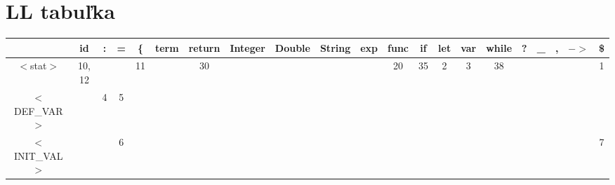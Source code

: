 \documentclass[a4paper,11pt]{article}
\begin{document}
\section{LL tabuľka}
\begin{table}[htbp]

\tiny
\begin{tabular}{|c|c|c|c|c|c|c|c|c|c|c|c|c|c|c|c|c|c|c|c|c|} 
\hline
              & \multicolumn{1}{c|}{id}     & \multicolumn{1}{c|}{:} & \multicolumn{1}{c|}{=} & \multicolumn{1}{c|}{\{} & \multicolumn{1}{c|}{term} & \multicolumn{1}{c|}{return} & \multicolumn{1}{c|}{Integer} & \multicolumn{1}{c|}{Double} & \multicolumn{1}{c|}{String} & \multicolumn{1}{c|}{exp} & \multicolumn{1}{c|}{func} & \multicolumn{1}{c|}{if} & \multicolumn{1}{c|}{let} & \multicolumn{1}{c|}{var} & \multicolumn{1}{c|}{while} & \multicolumn{1}{c|}{?}  & \multicolumn{1}{c|}{\_}     & \multicolumn{1}{c|}{,}  & \multicolumn{1}{c|}{$->$} & \$                     \\ 
\hline
$<$stat$>$          & \multicolumn{1}{c|}{10, 12} &                        &                        & \multicolumn{1}{c|}{11} &                           & \multicolumn{1}{c|}{30}     &                              &                             &                             &                          & \multicolumn{1}{c|}{20}   & \multicolumn{1}{c|}{35} & \multicolumn{1}{c|}{2}   & \multicolumn{1}{c|}{3}   & \multicolumn{1}{c|}{38}    &                         &                             &                         &                           & 1                      \\ 
\hline
$<$DEF\_VAR$>$      &                             & \multicolumn{1}{c|}{4} & \multicolumn{1}{c|}{5} &                         &                           &                             &                              &                             &                             &                          &                           &                         &                          &                          &                            &                         &                             &                         &                           & \multicolumn{1}{l|}{}  \\ 
\hline
$<$INIT\_VAL$>$     &                             &                        & \multicolumn{1}{c|}{6} &                         &                           &                             &                              &                             &                             &                          &                           &                         &                          &                          &                            &                         &                             &                         &                           & 7                      \\ 

\end{tabular}
\end{table}
\end{document}
